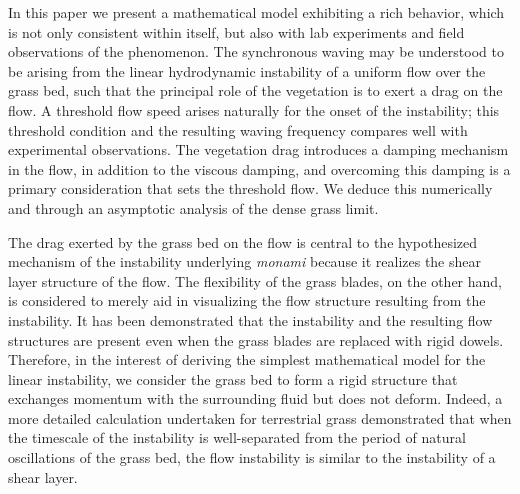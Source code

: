 \documentclass[aps,prl,reprint,twocolumn,showpacs,superscriptaddress,10pt]{revtex4-1}  %
\newcommand{\monami}{\textit{monami }}
\begin{document}
In this paper we present a mathematical model exhibiting a rich behavior, which is not only consistent within itself, but also with lab experiments and field observations of the phenomenon.
The synchronous waving may be understood to be arising from the linear hydrodynamic instability of a uniform flow over the grass bed, such that the principal role of the vegetation is to exert a drag on the flow. 
A threshold flow speed arises naturally for the onset of the instability; this threshold condition and the resulting waving frequency compares well with experimental observations.
The vegetation drag introduces a damping mechanism in the flow, in addition to the viscous damping, and overcoming this damping is a primary consideration that sets the threshold flow.
We deduce this numerically and through an asymptotic analysis of the dense grass limit.

The drag exerted by the grass bed on the flow is central to the hypothesized mechanism\cite{Ghisal02} of the instability underlying \monami because it realizes the shear layer structure of the flow. 
The flexibility of the grass blades, on the other hand, is considered to merely aid in visualizing the flow structure resulting from the instability\cite{Nepf2012}. 
It has been demonstrated that the instability and the resulting flow structures are present even when the grass blades are replaced with rigid dowels\cite{Ghisal02}. 
Therefore, in the interest of deriving the simplest mathematical model for the linear instability, we consider the grass bed to form a rigid structure that exchanges momentum with the surrounding fluid but does not deform. 
Indeed, a more detailed calculation undertaken for terrestrial grass demonstrated\cite{Delangre06} that when the timescale of the instability is well-separated from the period of natural oscillations of the grass bed, 
the flow instability is similar to the instability of a shear layer. 
\end{document}
